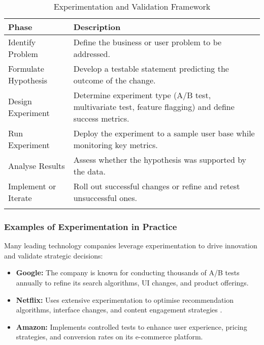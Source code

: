 \begin{longtable}{|p{6cm}|p{6cm}|}
    \hline
    \textbf{Phase}       & \textbf{Description}                                                                                  \\
    \hline
    Identify Problem     & Define the business or user problem to be addressed.                                                  \\
    \hline
    Formulate Hypothesis & Develop a testable statement predicting the outcome of the change.                                    \\
    \hline
    Design Experiment    & Determine experiment type (A/B test, multivariate test, feature flagging) and define success metrics. \\
    \hline
    Run Experiment       & Deploy the experiment to a sample user base while monitoring key metrics.                             \\
    \hline
    Analyse Results      & Assess whether the hypothesis was supported by the data.                                              \\
    \hline
    Implement or Iterate & Roll out successful changes or refine and retest unsuccessful ones.                                   \\
    \hline
    \caption{Experimentation and Validation Framework}
\end{longtable}

\subsubsection{Examples of Experimentation in Practice}
Many leading technology companies leverage experimentation to drive innovation and validate strategic decisions:

\begin{itemize}
    \item \textbf{Google:} The company is known for conducting thousands of A/B tests annually to refine its search algorithms, UI changes, and product offerings.
    \item \textbf{Netflix:} Uses extensive experimentation to optimise recommendation algorithms, interface changes, and content engagement strategies \cite{netflix2022experimentation}.
    \item \textbf{Amazon:} Implements controlled tests to enhance user experience, pricing strategies, and conversion rates on its e-commerce platform.
\end{itemize}

